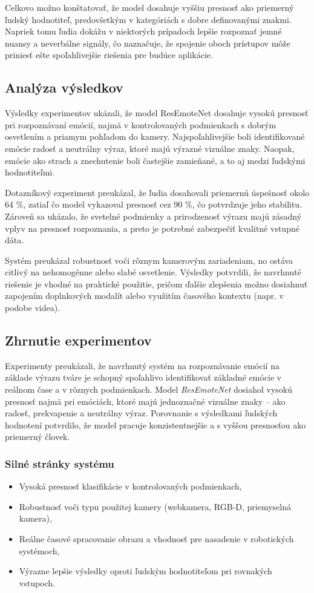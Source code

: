 Celkovo možno konštatovať, že model dosahuje vyššiu presnosť ako priemerný ľudský hodnotiteľ, predovšetkým v kategóriách s dobre definovanými znakmi. Napriek tomu ľudia dokážu v niektorých prípadoch lepšie rozpoznať jemné nuansy a neverbálne signály, čo naznačuje, že spojenie oboch prístupov môže priniesť ešte spoľahlivejšie riešenia pre budúce aplikácie.

\subsection{Analýza výsledkov}

Výsledky experimentov ukázali, že model ResEmoteNet dosahuje vysokú presnosť pri rozpoznávaní emócií, najmä v kontrolovaných podmienkach s dobrým osvetlením a priamym pohľadom do kamery. Najspoľahlivejšie boli identifikované emócie radosť a neutrálny výraz, ktoré majú výrazné vizuálne znaky. Naopak, emócie ako strach a znechutenie boli častejšie zamieňané, a to aj medzi ľudskými hodnotiteľmi.

Dotazníkový experiment preukázal, že ľudia dosahovali priemernú úspešnosť okolo 64 \%, zatiaľ čo model vykazoval presnosť cez 90 \%, čo potvrdzuje jeho stabilitu. Zároveň sa ukázalo, že svetelné podmienky a prirodzenosť výrazu majú zásadný vplyv na presnosť rozpoznania, a preto je potrebné zabezpečiť kvalitné vstupné dáta.

Systém preukázal robustnosť voči rôznym kamerovým zariadeniam, no ostáva citlivý na nehomogénne alebo slabé osvetlenie. Výsledky potvrdili, že navrhnuté riešenie je vhodné na praktické použitie, pričom ďalšie zlepšenia možno dosiahnuť zapojením doplnkových modalít alebo využitím časového kontextu (napr. v podobe videa).

\subsection{Zhrnutie experimentov}

Experimenty preukázali, že navrhnutý systém na rozpoznávanie emócií na základe výrazu tváre je schopný spoľahlivo identifikovať základné emócie v reálnom čase a v rôznych podmienkach. Model \textit{ResEmoteNet} dosiahol vysokú presnosť najmä pri emóciách, ktoré majú jednoznačné vizuálne znaky – ako radosť, prekvapenie a neutrálny výraz. Porovnanie s výsledkami ľudských hodnotení potvrdilo, že model pracuje konzistentnejšie a s vyššou presnosťou ako priemerný človek.

\subsubsection{Silné stránky systému}
\begin{itemize}
  \item Vysoká presnosť klasifikácie v kontrolovaných podmienkach,
  \item Robustnosť voči typu použitej kamery (webkamera, RGB-D, priemyselná kamera),
  \item Reálne časové spracovanie obrazu a vhodnosť pre nasadenie v robotických systémoch,
  \item Výrazne lepšie výsledky oproti ľudským hodnotiteľom pri rovnakých vstupoch.
\end{itemize}

